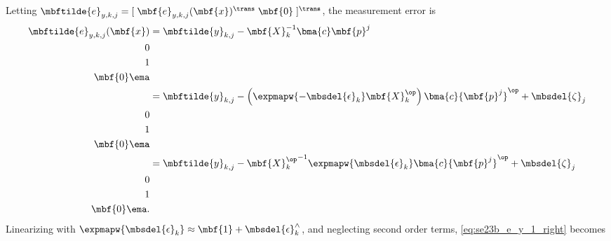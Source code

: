 Letting $\mbftilde{e}_{y,k,j} = [ \; \mbf{e}_{y,k,j}(\mbf{x})^\trans \;  \mbf{0} \; ]^\trans$, the measurement error is
\begin{align}
	\mbftilde{e}_{y,k,j}(\mbf{x}) &= \mbftilde{y}_{k,j} - \mbf{X}_k^{-1}\bma{c} \mbf{p}^j \\ 0 \\ 1 \\ \mbf{0} \ema \notag  \\
	&= \mbftilde{y}_{k,j} - \left(\expmapw{-\mbsdel{\epsilon}_k}\mbf{X}_k^\op\right)\bma{c} {\mbf{p}^j}^\op + \mbsdel{\zeta}_j \\ 0 \\ 1 \\ \mbf{0} \ema  \notag \\
	&= \mbftilde{y}_{k,j} - {\mbf{X}_k^\op}^{-1}\expmapw{\mbsdel{\epsilon}_k}\bma{c} {\mbf{p}^j}^\op + \mbsdel{\zeta}_j  \\ 0 \\ 1 \\ \mbf{0} \ema \label{eq:se23b_e_y_1_right}.
\end{align}
Linearizing with $\expmapw{\mbsdel{\epsilon}_k} \approx \mbf{1} + \mbsdel{\epsilon}_k^\wedge$, and neglecting second order terms, \eqref{eq:se23b_e_y_1_right} becomes
